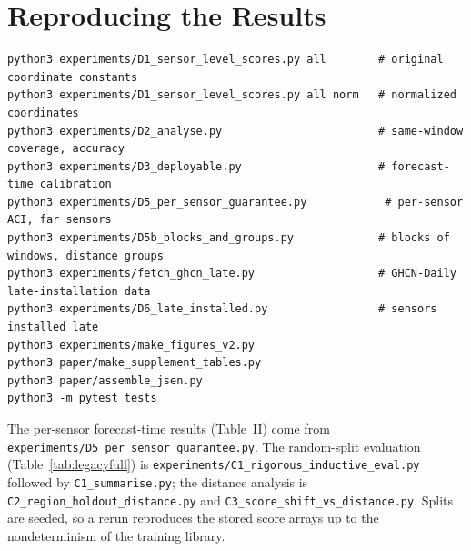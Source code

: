 \documentclass[journal,onecolumn]{IEEEtran}
\begin{document}
\section{Reproducing the Results}
\begin{verbatim}
python3 experiments/D1_sensor_level_scores.py all        # original coordinate constants
python3 experiments/D1_sensor_level_scores.py all norm   # normalized coordinates
python3 experiments/D2_analyse.py                        # same-window coverage, accuracy
python3 experiments/D3_deployable.py                     # forecast-time calibration
python3 experiments/D5_per_sensor_guarantee.py            # per-sensor ACI, far sensors
python3 experiments/D5b_blocks_and_groups.py             # blocks of windows, distance groups
python3 experiments/fetch_ghcn_late.py                   # GHCN-Daily late-installation data
python3 experiments/D6_late_installed.py                 # sensors installed late
python3 experiments/make_figures_v2.py
python3 paper/make_supplement_tables.py
python3 paper/assemble_jsen.py
python3 -m pytest tests
\end{verbatim}
The per-sensor forecast-time results (Table~II) come from \texttt{experiments/D5\_per\_sensor\_guarantee.py}. The
random-split evaluation (Table~\ref{tab:legacyfull}) is \texttt{experiments/C1\_rigorous\_inductive\_eval.py}
followed by \texttt{C1\_summarise.py}; the distance analysis is \texttt{C2\_region\_holdout\_distance.py}
and \texttt{C3\_score\_shift\_vs\_distance.py}. Splits are seeded, so a rerun reproduces the stored
score arrays up to the nondeterminism of the training library.
\end{document}
